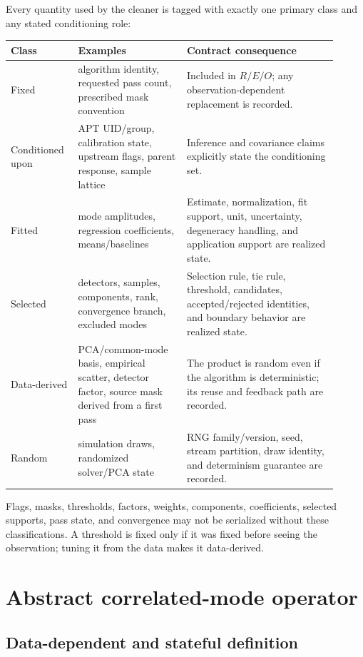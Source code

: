 \documentclass[11pt]{article}
\begin{document}
Every quantity used by the cleaner is tagged with exactly one primary class
and any stated conditioning role:
\begin{longtable}{>{\raggedright\arraybackslash}p{0.17\linewidth}
                  >{\raggedright\arraybackslash}p{0.31\linewidth}
                  >{\raggedright\arraybackslash}p{0.43\linewidth}}
\toprule
Class & Examples & Contract consequence \\
\midrule
\endhead
Fixed & algorithm identity, requested pass count, prescribed mask convention
& Included in $R/E/O$; any observation-dependent replacement is recorded.\\
Conditioned upon & APT UID/group, calibration state, upstream flags, parent
response, sample lattice & Inference and covariance claims explicitly state
the conditioning set.\\
Fitted & mode amplitudes, regression coefficients, means/baselines & Estimate,
normalization, fit support, unit, uncertainty, degeneracy handling, and
application support are realized state.\\
Selected & detectors, samples, components, rank, convergence branch, excluded
modes & Selection rule, tie rule, threshold, candidates, accepted/rejected
identities, and boundary behavior are realized state.\\
Data-derived & PCA/common-mode basis, empirical scatter, detector factor,
source mask derived from a first pass & The product is random even if the
algorithm is deterministic; its reuse and feedback path are recorded.\\
Random & simulation draws, randomized solver/PCA state & RNG family/version,
seed, stream partition, draw identity, and determinism guarantee are recorded.\\
\bottomrule
\end{longtable}
Flags, masks, thresholds, factors, weights, components, coefficients,
selected supports, pass state, and convergence may not be serialized without
these classifications.  A threshold is fixed only if it was fixed before
seeing the observation; tuning it from the data makes it data-derived.

\section{Abstract correlated-mode operator}
\label{sec:operator}

\subsection{Data-dependent and stateful definition}
\end{document}
